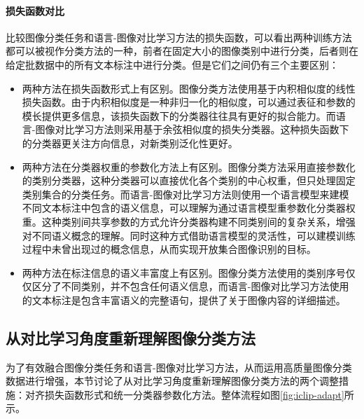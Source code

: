 \paragraph{损失函数对比} 比较图像分类任务和语言-图像对比学习方法的损失函数，可以看出两种训练方法都可以被视作分类方法的一种，前者在固定大小的图像类别中进行分类，后者则在给定批数据中的所有文本标注中进行分类。但是它们之间仍有三个主要区别：
\begin{itemize}
    \item 两种方法在损失函数形式上有区别。图像分类方法使用基于内积相似度的线性损失函数。由于内积相似度是一种非归一化的相似度，可以通过表征和参数的模长提供更多信息，该损失函数下的分类器往往具有更好的拟合能力。而语言-图像对比学习方法则采用基于余弦相似度的损失分类器。这种损失函数下的分类器更关注方向信息，对新类别泛化性更好\cite{cao2020parametric,DengArcFace,wang2018cosface}。
    \item 两种方法在分类器权重的参数化方法上有区别。图像分类方法采用直接参数化的类别分类器，这种分类器可以直接优化各个类别的中心权重，但只处理固定类别集合的分类任务。而语言-图像对比学习方法则使用一个语言模型来建模不同文本标注中包含的语义信息，可以理解为通过语言模型重参数化分类器权重。这种类别间共享参数的方式允许分类器构建不同类别间的复杂关系，增强对不同语义概念的理解。同时这种方式借助语言模型的灵活性，可以建模训练过程中未曾出现过的概念信息，从而实现开放集合图像识别的目标。
    \item 两种方法在标注信息的语义丰富度上有区别。图像分类方法使用的类别序号仅仅区分了不同类别，并不包含任何语义信息，而语言-图像对比学习方法使用的文本标注是包含丰富语义的完整语句，提供了关于图像内容的详细描述。
\end{itemize}


\subsection{从对比学习角度重新理解图像分类方法}
\label{sec:iclip-adapt-classification}
为了有效融合图像分类任务和语言-图像对比学习方法，从而运用高质量图像分类数据进行增强，本节讨论了从对比学习角度重新理解图像分类方法的两个调整措施：对齐损失函数形式和统一分类器参数化方法。整体流程如图\ref{fig:iclip-adapt}所示。

